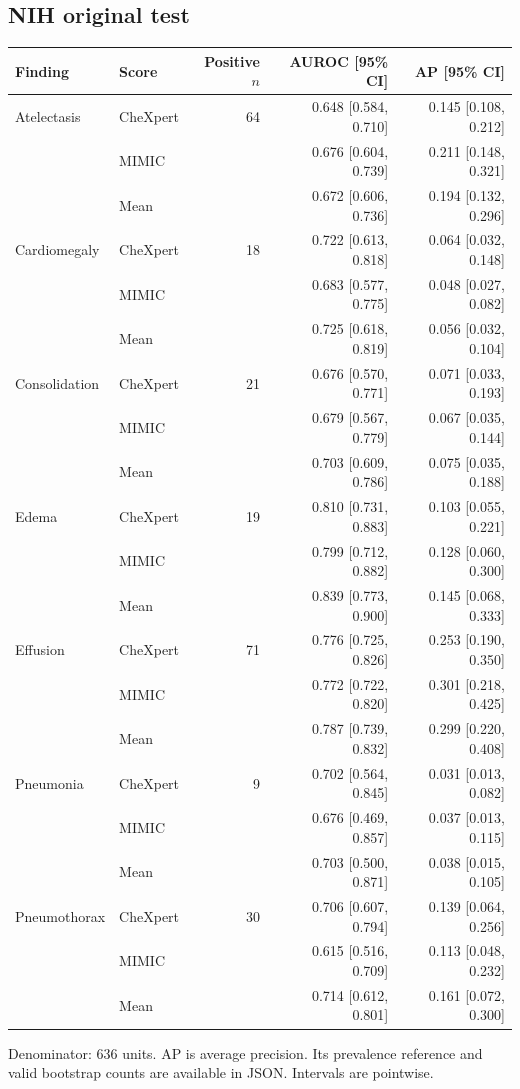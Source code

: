\subsection*{NIH original test}
\begin{center}\small\setlength{\tabcolsep}{4pt}
\begin{tabular}{llrrr}\toprule
Finding & Score & Positive $n$ & AUROC [95\% CI] & AP [95\% CI]\\\midrule
Atelectasis & CheXpert & 64 & 0.648 [0.584, 0.710] & 0.145 [0.108, 0.212] \\
 & MIMIC &  & 0.676 [0.604, 0.739] & 0.211 [0.148, 0.321] \\
 & Mean &  & 0.672 [0.606, 0.736] & 0.194 [0.132, 0.296] \\
Cardiomegaly & CheXpert & 18 & 0.722 [0.613, 0.818] & 0.064 [0.032, 0.148] \\
 & MIMIC &  & 0.683 [0.577, 0.775] & 0.048 [0.027, 0.082] \\
 & Mean &  & 0.725 [0.618, 0.819] & 0.056 [0.032, 0.104] \\
Consolidation & CheXpert & 21 & 0.676 [0.570, 0.771] & 0.071 [0.033, 0.193] \\
 & MIMIC &  & 0.679 [0.567, 0.779] & 0.067 [0.035, 0.144] \\
 & Mean &  & 0.703 [0.609, 0.786] & 0.075 [0.035, 0.188] \\
Edema & CheXpert & 19 & 0.810 [0.731, 0.883] & 0.103 [0.055, 0.221] \\
 & MIMIC &  & 0.799 [0.712, 0.882] & 0.128 [0.060, 0.300] \\
 & Mean &  & 0.839 [0.773, 0.900] & 0.145 [0.068, 0.333] \\
Effusion & CheXpert & 71 & 0.776 [0.725, 0.826] & 0.253 [0.190, 0.350] \\
 & MIMIC &  & 0.772 [0.722, 0.820] & 0.301 [0.218, 0.425] \\
 & Mean &  & 0.787 [0.739, 0.832] & 0.299 [0.220, 0.408] \\
Pneumonia & CheXpert & 9 & 0.702 [0.564, 0.845] & 0.031 [0.013, 0.082] \\
 & MIMIC &  & 0.676 [0.469, 0.857] & 0.037 [0.013, 0.115] \\
 & Mean &  & 0.703 [0.500, 0.871] & 0.038 [0.015, 0.105] \\
Pneumothorax & CheXpert & 30 & 0.706 [0.607, 0.794] & 0.139 [0.064, 0.256] \\
 & MIMIC &  & 0.615 [0.516, 0.709] & 0.113 [0.048, 0.232] \\
 & Mean &  & 0.714 [0.612, 0.801] & 0.161 [0.072, 0.300] \\
\bottomrule\end{tabular}\end{center}
\noindent Denominator: 636 units. AP is average precision. Its prevalence reference and valid bootstrap counts are available in JSON. Intervals are pointwise.
\clearpage
